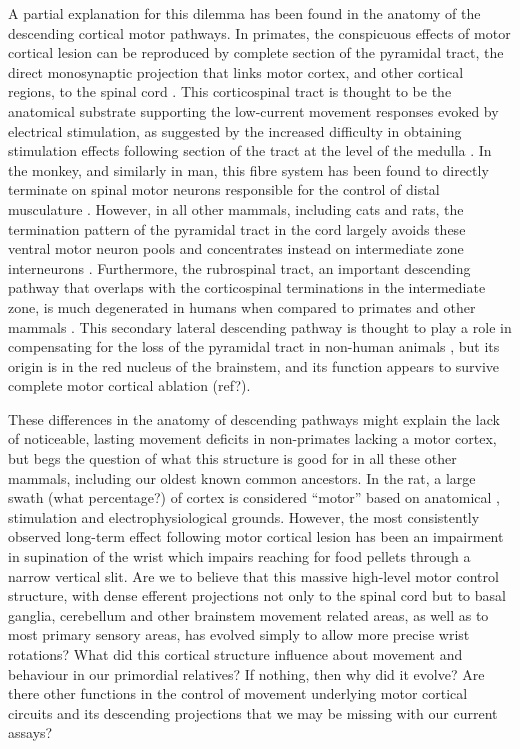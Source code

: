 A partial explanation for this dilemma has been found in the anatomy of the descending cortical motor pathways. In primates, the conspicuous effects of motor cortical lesion can be reproduced by complete section of the pyramidal tract, the direct monosynaptic projection that links motor cortex, and other cortical regions, to the spinal cord \cite{Tower1940,Lawrence1968}. This corticospinal tract is thought to be the anatomical substrate supporting the low-current movement responses evoked by electrical stimulation, as suggested by the increased difficulty in obtaining stimulation effects following section of the tract at the level of the medulla \cite{Woolsey1972}. In the monkey, and similarly in man, this fibre system has been found to directly terminate on spinal motor neurons responsible for the control of distal musculature \cite{Leyton1917,Bernhard1954}. However, in all other mammals, including cats and rats, the termination pattern of the pyramidal tract in the cord largely avoids these ventral motor neuron pools and concentrates instead on intermediate zone interneurons \cite{Kuypers1981,Yang2003}. Furthermore, the rubrospinal tract, an important descending pathway that overlaps with the corticospinal terminations in the intermediate zone, is much degenerated in humans when compared to primates and other mammals \cite{Square1982}. This secondary lateral descending pathway is thought to play a role in compensating for the loss of the pyramidal tract in non-human animals \cite{Lawrence1968a,Zaaimi2012}, but its origin is in the red nucleus of the brainstem, and its function appears to survive complete motor cortical ablation (ref?).

These differences in the anatomy of descending pathways might explain the lack of noticeable, lasting movement deficits in non-primates lacking a motor cortex, but begs the question of what this structure is good for in all these other mammals, including our oldest known common ancestors. In the rat, a large swath (what percentage?) of cortex is considered ``motor'' based on anatomical \cite{Donoghue1982}, stimulation \cite{Donoghue1982,Neafsey1986} and electrophysiological grounds. However, the most consistently observed long-term effect following motor cortical lesion has been an impairment in supination of the wrist which impairs reaching for food pellets through a narrow vertical slit. Are we to believe that this massive high-level motor control structure, with dense efferent projections not only to the spinal cord but to basal ganglia, cerebellum and other brainstem movement related areas, as well as to most primary sensory areas, has evolved simply to allow more precise wrist rotations? What did this cortical structure influence about movement and behaviour in our primordial relatives? If nothing, then why did it evolve? Are there other functions in the control of movement underlying motor cortical circuits and its descending projections that we may be missing with our current assays?

